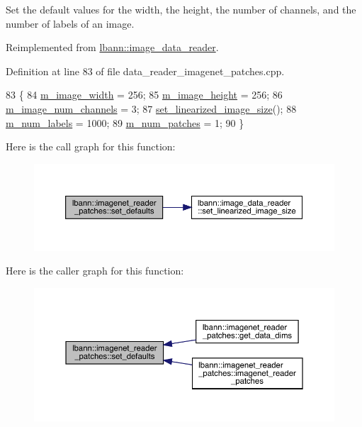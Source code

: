 Set the default values for the width, the height, the number of channels, and the number of labels of an image. 



Reimplemented from \hyperlink{classlbann_1_1image__data__reader_a8e9dbeaa0239d56597455cc23787a21d}{lbann\+::image\+\_\+data\+\_\+reader}.



Definition at line 83 of file data\+\_\+reader\+\_\+imagenet\+\_\+patches.\+cpp.


\begin{DoxyCode}
83                                            \{
84   \hyperlink{classlbann_1_1image__data__reader_af001f3d1c0f1c580b66988233b3a64f0}{m\_image\_width} = 256;
85   \hyperlink{classlbann_1_1image__data__reader_a0632efa3deaa9d61e671f741909eb3fe}{m\_image\_height} = 256;
86   \hyperlink{classlbann_1_1image__data__reader_aab1a440f361521dc7bd583cefe1061f8}{m\_image\_num\_channels} = 3;
87   \hyperlink{classlbann_1_1image__data__reader_a0164b0e3abbe92daef73b36fb925403e}{set\_linearized\_image\_size}();
88   \hyperlink{classlbann_1_1image__data__reader_af280e8758a6ec3acee7c62e6351d17e0}{m\_num\_labels} = 1000;
89   \hyperlink{classlbann_1_1imagenet__reader__patches_a3380936d3d01d5efc77f0f129891fc65}{m\_num\_patches} = 1;
90 \}
\end{DoxyCode}
Here is the call graph for this function\+:\nopagebreak
\begin{figure}[H]
\begin{center}
\leavevmode
\includegraphics[width=350pt]{classlbann_1_1imagenet__reader__patches_a3458e4274b9ed894973a069cf884f04a_cgraph}
\end{center}
\end{figure}
Here is the caller graph for this function\+:\nopagebreak
\begin{figure}[H]
\begin{center}
\leavevmode
\includegraphics[width=350pt]{classlbann_1_1imagenet__reader__patches_a3458e4274b9ed894973a069cf884f04a_icgraph}
\end{center}
\end{figure}
